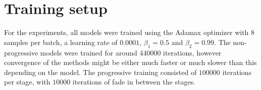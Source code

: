 \section{Training setup}
For the experiments, all models were trained using the Adamax optimizer \parencite{kingma2014adam} with $8$ samples per batch, a learning rate of $0.0001$, $\beta_1 = 0.5$ and $\beta_2 = 0.99$. The non-progressive models were trained for around 440000 iterations, however convergence of the methods might be either much faster or much slower than this depending on the model. The progressive training consisted of $100000$ iterations per stage, with $10000$ iterations of fade in between the stages.

